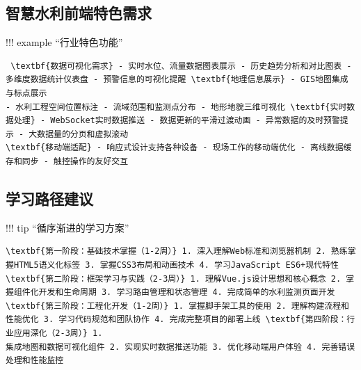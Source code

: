 \subsection{智慧水利前端特色需求}\label{ux667aux6167ux6c34ux5229ux524dux7aefux7279ux8272ux9700ux6c42} !!! example ``行业特色功能''
\begin{verbatim} \textbf{数据可视化需求} - 实时水位、流量数据图表展示 - 历史趋势分析和对比图表 - 多维度数据统计仪表盘 - 预警信息的可视化提醒 \textbf{地理信息展示} - GIS地图集成与标点展示
- 水利工程空间位置标注 - 流域范围和监测点分布 - 地形地貌三维可视化 \textbf{实时数据处理} - WebSocket实时数据推送 - 数据更新的平滑过渡动画 - 异常数据的及时预警提示 - 大数据量的分页和虚拟滚动
\textbf{移动端适配} - 响应式设计支持各种设备 - 现场工作的移动端优化 - 离线数据缓存和同步 - 触控操作的友好交互 \end{verbatim}
\subsection{学习路径建议}\label{ux5b66ux4e60ux8defux5f84ux5efaux8bae} !!! tip ``循序渐进的学习方案'' \begin{verbatim}
\textbf{第一阶段：基础技术掌握（1-2周）} 1. 深入理解Web标准和浏览器机制 2. 熟练掌握HTML5语义化标签 3. 掌握CSS3布局和动画技术 4. 学习JavaScript ES6+现代特性
\textbf{第二阶段：框架学习与实践（2-3周）} 1. 理解Vue.js设计思想和核心概念 2. 掌握组件化开发和生命周期 3. 学习路由管理和状态管理 4. 完成简单的水利监测页面开发
\textbf{第三阶段：工程化开发（1-2周）} 1. 掌握脚手架工具的使用 2. 理解构建流程和性能优化 3. 学习代码规范和团队协作 4. 完成完整项目的部署上线 \textbf{第四阶段：行业应用深化（2-3周）} 1.
集成地图和数据可视化组件 2. 实现实时数据推送功能 3. 优化移动端用户体验 4. 完善错误处理和性能监控 \end{verbatim}
